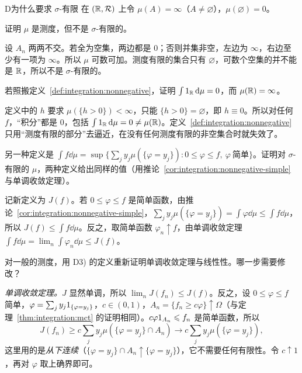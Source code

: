 \thinkingpart

\begin{probleme}[问题]{D}{为什么要求 \texorpdfstring{$\sigma$}{σ}-有限}
在 $(\mathbb{R},\mathcal{R})$ 上令 $\mu(A)=\infty$（$A\neq\varnothing$），$\mu(\varnothing)=0$。
\begin{questions}
\item 证明 $\mu$ 是测度，但不是 $\sigma$-有限的。
\begin{solution}
设 $A_n$ 两两不交。若全为空集，两边都是 $0$；否则并集非空，左边为 $\infty$，右边至少有一项为 $\infty$。所以 $\mu$ 可数可加。测度有限的集合只有 $\varnothing$，可数个空集的并不能是 $\mathbb{R}$，所以不是 $\sigma$-有限的。
\end{solution}
\item 若照搬定义~\ref{def:integration:nonnegative}，证明 $\int1_{\mathbb{R}}\,\mathrm{d}\mu=0$，而 $\mu(\mathbb{R})=\infty$。
\begin{solution}
定义中的 $h$ 要求 $\mu(\{h>0\})<\infty$，只能 $\{h>0\}=\varnothing$，即 $h\equiv0$。所以对任何 $f$，“积分”都是 $0$，包括 $\int1_{\mathbb{R}}\,\mathrm{d}\mu=0\neq\mu(\mathbb{R})$。定义~\ref{def:integration:nonnegative} 只用“测度有限的部分”去逼近，在没有任何测度有限的非空集合时就失效了。
\end{solution}
\item 另一种定义是 $\int f\dd\mu=\sup\{\sum_jy_j\mu(\{\varphi=y_j\}):0\leqslant\varphi\leqslant f,\ \varphi\ \text{简单}\}$。证明对 $\sigma$-有限的 $\mu$，两种定义给出同样的值（用推论~\ref{cor:integration:nonnegative-simple} 与单调收敛定理）。
\begin{solution}
记新定义为 $J(f)$。若 $0\leqslant\varphi\leqslant f$ 是简单函数，由推论~\ref{cor:integration:nonnegative-simple}，$\sum_jy_j\mu(\{\varphi=y_j\})=\int\varphi\dd\mu\leqslant\int f\dd\mu$，所以 $J(f)\leqslant\int f\dd\mu$。反之，取简单函数 $\varphi_n\uparrow f$，由单调收敛定理 $\int f\dd\mu=\lim_n\int\varphi_n\dd\mu\leqslant J(f)$。
\end{solution}
\item 对一般的测度，用 D3) 的定义重新证明单调收敛定理与线性性。哪一步需要修改？
\begin{solution}
\emph{单调收敛定理。}$J$ 显然单调，所以 $\lim_nJ(f_n)\leqslant J(f)$。反之，设 $0\leqslant\varphi\leqslant f$ 简单，$\varphi=\sum_jy_j1_{\{\varphi=y_j\}}$，$c\in(0,1)$，$A_n=\{f_n\geqslant c\varphi\}\uparrow\Omega$（与定理~\ref{thm:integration:mct} 的证明相同）。$c\varphi1_{A_n}\leqslant f_n$ 是简单函数，所以
\[
J(f_n)\geqslant c\sum_jy_j\mu(\{\varphi=y_j\}\cap A_n)\to c\sum_jy_j\mu(\{\varphi=y_j\}),
\]
这里用的是\emph{从下连续}（$\{\varphi=y_j\}\cap A_n\uparrow\{\varphi=y_j\}$），它不需要任何有限性。令 $c\uparrow1$，再对 $\varphi$ 取上确界即可。


\end{solution}
\end{questions}
\end{probleme}
